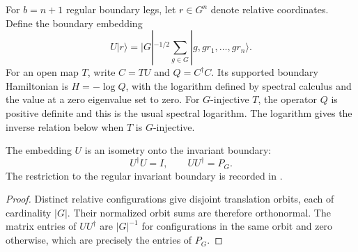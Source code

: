 \begin{definition}%
    \label{def:peps_regular_boundary_support_embedding}
    \leanok
    For $b=n+1$ regular boundary legs, let $r\in G^n$ denote
    relative coordinates. Define the boundary embedding
    \[
        U|r\rangle=|G|^{-1/2}
        \sum_{g\in G}|g,gr_1,\ldots,gr_n\rangle.
    \]
    For an open map $T$, write $C=TU$ and
    $Q=C^\dagger C$. Its supported boundary Hamiltonian is
    $H=-\log Q$, with the logarithm defined by spectral calculus
    and the value at a zero eigenvalue set to zero. For
    $G$-injective $T$, the operator $Q$ is positive definite
    and this is the usual spectral logarithm.
    The logarithm gives the inverse relation below when $T$ is
    $G$-injective.
\end{definition}

\begin{lemma}%
    \label{thm:peps_regular_boundary_support_embedding}
    \leanok
    The embedding $U$ is an isometry onto the invariant boundary:
    \[
        U^\dagger U=I,\qquad UU^\dagger=P_G.
    \]
    The restriction to the regular invariant boundary is recorded in
    \cite{gap:rmp_peps_quantum_double_g_isometry}.
\end{lemma}

\begin{proof}\leanok
    Distinct relative configurations give disjoint translation
    orbits, each of cardinality $|G|$. Their normalized orbit sums
    are therefore orthonormal. The matrix entries of $UU^\dagger$
    are $|G|^{-1}$ for configurations in the same orbit and zero
    otherwise, which are precisely the entries of $P_G$.
\end{proof}

